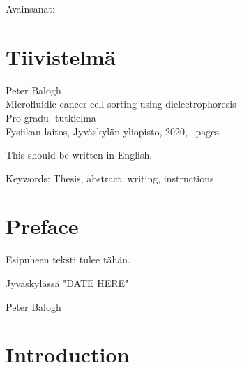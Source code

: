 \documentclass[final]{jyflluk}
\newcommand{\Otsikko}{Microfluidic cancer cell sorting using dielectrophoresis}
\begin{document}
\bigskip

\noindent Avainsanat: 

\section*{Tiivistelmä}

Peter Balogh\\
\Otsikko \\
Pro gradu -tutkielma \\
Fysiikan laitos, Jyväskylän yliopisto, 2020, \pageref{LastPage}~pages.

\bigskip

\begin{otherlanguage}{english}
\noindent This should be written in English.
\end{otherlanguage}

\bigskip 

\noindent Keywords: Thesis, abstract, writing, instructions

\section*{Preface}

Esipuheen teksti tulee tähän.

\bigskip

Jyväskylässä "DATE HERE"

\bigskip

Peter Balogh

\tableofcontents

\section{Introduction}
\label{sec:introduction}
\end{document}
